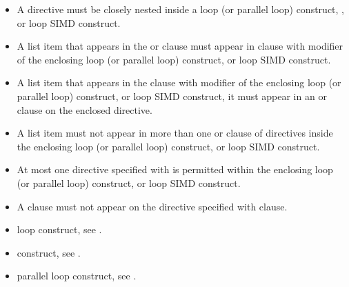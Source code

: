 \begin{itemize}

\item A  directive must be closely nested inside a loop
(or parallel loop) construct, , or loop SIMD construct.

\item A list item that appears in the  or  clause must
appear in  clause with  modifier of the enclosing loop
(or parallel loop) construct,  or loop SIMD construct.

\item A list item that appears in the  clause with  modifier 
of the enclosing loop (or parallel loop) construct,  or loop SIMD construct, it must appear in an  
or  clause on the enclosed  directive.  

\item A list item must not appear in more than one  or  clause of  directives 
inside the enclosing loop (or parallel loop) construct,  or loop SIMD construct.

\item At most one  directive specified with  is permitted within 
the enclosing loop (or parallel loop) construct,  or loop SIMD construct.

\item A  clause must not appear on the  directive specified with  clause. 

\end{itemize}

\crossreferences
\begin{itemize}
\item loop construct, see
.


\item {} construct, see
.

\item parallel loop construct, see
.
\end{itemize}

\pagebreak
